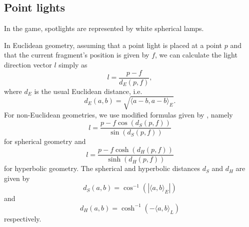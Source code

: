 \subsection{Point lights}
In the game, spotlights are represented by white spherical lamps.

In Euclidean geometry, assuming that a point light is placed at a point $p$ and that the current fragment's position is given by $f$, we can calculate the light direction vector $l$ simply as
\begin{equation*}
    l = \frac{p - f}{d_E(p, f)},
\end{equation*}
where $d_E$ is the usual Euclidean distance, i.e.
\begin{equation} \label{eq:dist-euclidean}
    d_E(a, b) = \sqrt{\langle a - b, a - b\rangle_E}.
\end{equation}
For non-Euclidean geometries, we use modified formulas given by \cite{Szirmay-Kalos2022}, namely
\begin{equation}
    l = \frac{p - f \cos(d_S(p, f))}{\sin(d_S(p, f))}
\end{equation}
for spherical geometry and
\begin{equation}
    l = \frac{p - f\cosh(d_H(p, f))}{\sinh(d_H(p, f))}
\end{equation}
for hyperbolic geometry.
The spherical and hyperbolic distances $d_S$ and $d_H$ are given by
\begin{equation} \label{eq:dist-spherical}
    d_S(a, b) = \cos^{-1}(|\langle a, b \rangle_E|)
\end{equation}
and
\begin{equation} \label{eq:dist-hyperbolic}
    d_H(a, b) = \cosh^{-1}(-\langle a, b \rangle_L)
\end{equation}
respectively.

